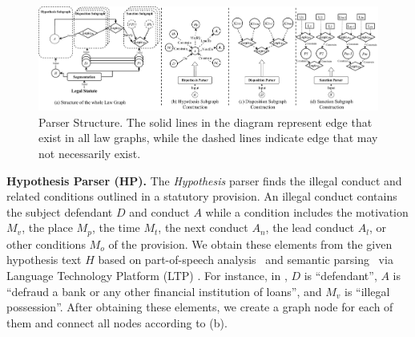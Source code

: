 \begin{figure}
    \centering    \includegraphics[width=\linewidth]{figs/Law Graph Structure.pdf}
    \caption{\lawgraph{} Parser Structure. The solid lines in the diagram represent edge that exist in all law graphs, while the dashed lines indicate edge that may not necessarily exist.
    }
    \label{fig:law-graph-parser-structure}
    \vspace{-1.5em}
\end{figure}

\textbf{Hypothesis Parser (HP).} The \textit{Hypothesis} parser finds the illegal conduct and related conditions outlined in a statutory provision. An illegal conduct contains the subject defendant $D$ and conduct $A$ while a condition includes the motivation $M_v$, the place $M_p$, the time $M_t$, the next conduct $A_n$, the lead conduct $A_l$, or other conditions $M_o$ of the provision. We obtain these elements from the given hypothesis text $H$ based on part-of-speech analysis~\cite{chiche2022part} and semantic parsing~\cite{lindemann-etal-2019-compositional} via Language Technology Platform (LTP) \cite{che-etal-2010-ltp}. 
For instance, in , $D$ is ``defendant'', $A$ is ``defraud a bank or any other financial institution of loans'', and $M_v$ is ``illegal possession''. 
After obtaining these elements, we create a graph node for each of them and connect all nodes according to  (b). 


